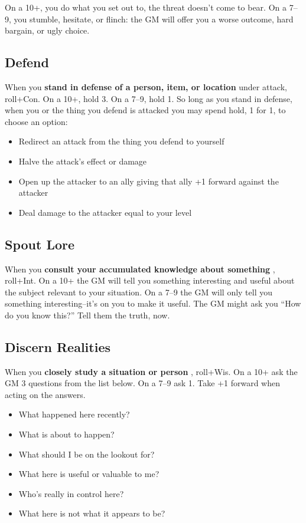  On a 10+, you do what you set out to, the threat doesn't come to bear. On a 7--9, you stumble, hesitate, or flinch: the GM will offer you a worse outcome, hard bargain, or ugly choice.
\subsection{Defend}


 When you \textbf{stand in defense of a person, item, or location}
 under attack, roll+Con. On a 10+, hold 3. On a 7--9, hold 1. So long as you stand in defense, when you or the thing you defend is attacked you may spend hold, 1 for 1, to choose an option:
\begin{itemize}
\item Redirect an attack from the thing you defend to yourself
\item Halve the attack's effect or damage
\item Open up the attacker to an ally giving that ally +1 forward against the attacker
\item Deal damage to the attacker equal to your level

\end{itemize}
\subsection{Spout Lore}


 When you \textbf{consult your accumulated knowledge about something}
, roll+Int. On a 10+ the GM will tell you something interesting and useful about the subject relevant to your situation. On a 7--9 the GM will only tell you something interesting--it's on you to make it useful. The GM might ask you ``How do you know this?'' Tell them the truth, now.
\subsection{Discern Realities}


 When you \textbf{closely study a situation or person}
, roll+Wis. On a 10+ ask the GM 3 questions from the list below. On a 7--9 ask 1. Take +1 forward when acting on the answers.
\begin{itemize}
\item What happened here recently?
\item What is about to happen?
\item What should I be on the lookout for?
\item What here is useful or valuable to me?
\item Who's really in control here?
\item What here is not what it appears to be?

\end{itemize}
